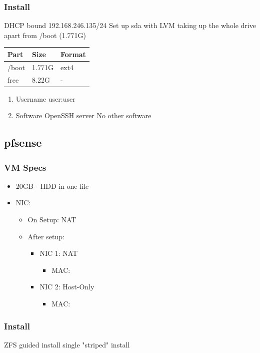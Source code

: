 \documentclass[11pt]{article}
\begin{document}
\subsubsection{Install}
\label{sec:orgf8850c4}
DHCP bound 192.168.246.135/24
Set up sda with LVM taking up the whole drive apart from /boot (1.771G)
\begin{center}
\begin{tabular}{lll}
Part & Size & Format\\[0pt]
\hline
/boot & 1.771G & ext4\\[0pt]
free & 8.22G & -\\[0pt]
\end{tabular}
\end{center}
\begin{enumerate}
\item Username
\label{sec:org6d77f20}
user:user
\item Software
\label{sec:orged7f996}
OpenSSH server
No other software
\end{enumerate}
\subsection{pfsense}
\label{sec:org10c02e0}
\subsubsection{VM Specs}
\label{sec:org8ee7017}
\begin{itemize}
\item 20GB -  HDD in one file
\item NIC:
\begin{itemize}
\item On Setup: NAT
\item After setup:
\begin{itemize}
\item NIC 1: NAT
\begin{itemize}
\item MAC:
\end{itemize}
\item NIC 2: Host-Only
\begin{itemize}
\item MAC:
\end{itemize}
\end{itemize}
\end{itemize}
\end{itemize}
\subsubsection{Install}
\label{sec:org2294b6e}
ZFS guided install single "striped" install
\end{document}

